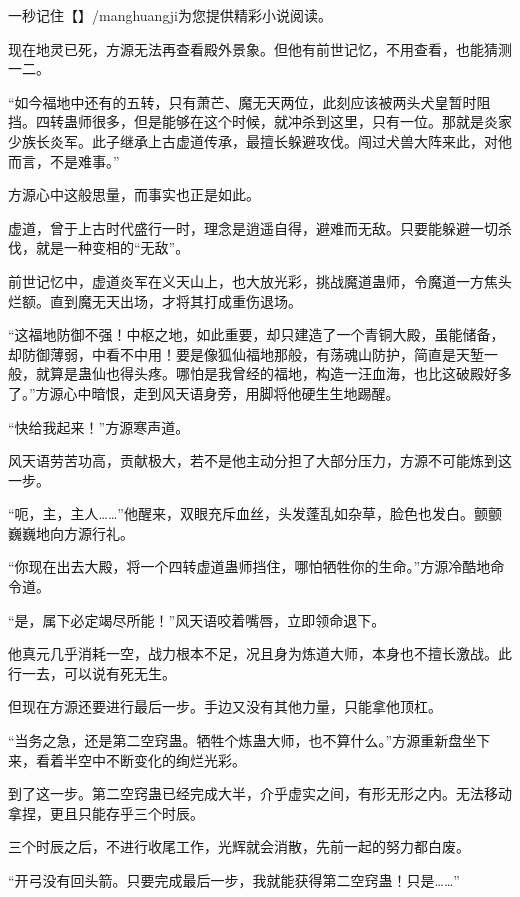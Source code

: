 
\begin{this_body}

一秒记住【】/manghuangji为您提供精彩小说阅读。

现在地灵已死，方源无法再查看殿外景象。但他有前世记忆，不用查看，也能猜测一二。

“如今福地中还有的五转，只有萧芒、魔无天两位，此刻应该被两头犬皇暂时阻挡。四转蛊师很多，但是能够在这个时候，就冲杀到这里，只有一位。那就是炎家少族长炎军。此子继承上古虚道传承，最擅长躲避攻伐。闯过犬兽大阵来此，对他而言，不是难事。”

方源心中这般思量，而事实也正是如此。

虚道，曾于上古时代盛行一时，理念是逍遥自得，避难而无敌。只要能躲避一切杀伐，就是一种变相的“无敌”。

前世记忆中，虚道炎军在义天山上，也大放光彩，挑战魔道蛊师，令魔道一方焦头烂额。直到魔无天出场，才将其打成重伤退场。

“这福地防御不强！中枢之地，如此重要，却只建造了一个青铜大殿，虽能储备，却防御薄弱，中看不中用！要是像狐仙福地那般，有荡魂山防护，简直是天堑一般，就算是蛊仙也得头疼。哪怕是我曾经的福地，构造一汪血海，也比这破殿好多了。”方源心中暗恨，走到风天语身旁，用脚将他硬生生地踢醒。

“快给我起来！”方源寒声道。

风天语劳苦功高，贡献极大，若不是他主动分担了大部分压力，方源不可能炼到这一步。

“呃，主，主人……”他醒来，双眼充斥血丝，头发蓬乱如杂草，脸色也发白。颤颤巍巍地向方源行礼。

“你现在出去大殿，将一个四转虚道蛊师挡住，哪怕牺牲你的生命。”方源冷酷地命令道。

“是，属下必定竭尽所能！”风天语咬着嘴唇，立即领命退下。

他真元几乎消耗一空，战力根本不足，况且身为炼道大师，本身也不擅长激战。此行一去，可以说有死无生。

但现在方源还要进行最后一步。手边又没有其他力量，只能拿他顶杠。

“当务之急，还是第二空窍蛊。牺牲个炼蛊大师，也不算什么。”方源重新盘坐下来，看着半空中不断变化的绚烂光彩。

到了这一步。第二空窍蛊已经完成大半，介乎虚实之间，有形无形之内。无法移动拿捏，更且只能存乎三个时辰。

三个时辰之后，不进行收尾工作，光辉就会消散，先前一起的努力都白废。

“开弓没有回头箭。只要完成最后一步，我就能获得第二空窍蛊！只是……”


\end{this_body}

